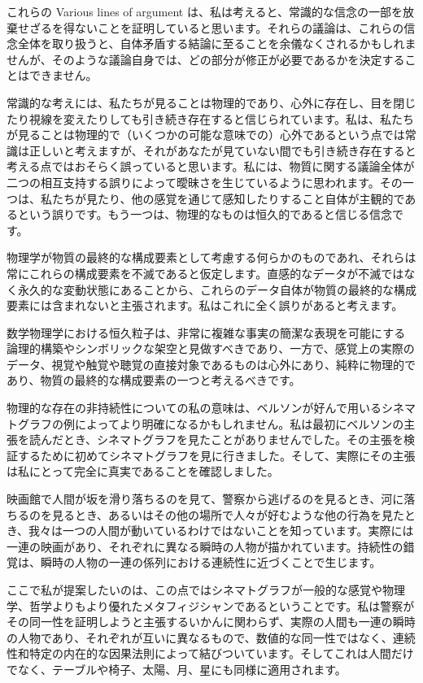 \documentclass[a4paper,11pt,openany]{ltjsbook}
\begin{document}
これらの Various lines of argument は、私は考えると、常識的な信念の一部を放棄せざるを得ないことを証明していると思います。それらの議論は、これらの信念全体を取り扱うと、自体矛盾する結論に至ることを余儀なくされるかもしれませんが、そのような議論自身では、どの部分が修正が必要であるかを決定することはできません。

常識的な考えには、私たちが見ることは物理的であり、心外に存在し、目を閉じたり視線を変えたりしても引き続き存在すると信じられています。私は、私たちが見ることは物理的で（いくつかの可能な意味での）心外であるという点では常識は正しいと考えますが、それがあなたが見ていない間でも引き続き存在すると考える点ではおそらく誤っていると思います。私には、物質に関する議論全体が二つの相互支持する誤りによって曖昧さを生じているように思われます。その一つは、私たちが見たり、他の感覚を通じて感知したりすること自体が主観的であるという誤りです。もう一つは、物理的なものは恒久的であると信じる信念です。

物理学が物質の最終的な構成要素として考慮する何らかのものであれ、それらは常にこれらの構成要素を不滅であると仮定します。直感的なデータが不滅ではなく永久的な変動状態にあることから、これらのデータ自体が物質の最終的な構成要素には含まれないと主張されます。私はこれに全く誤りがあると考えます。

数学物理学における恒久粒子は、非常に複雑な事実の簡潔な表現を可能にする論理的構築やシンボリックな架空と見做すべきであり、一方で、感覚上の実際のデータ、視覚や触覚や聴覚の直接対象であるものは心外にあり、純粋に物理的であり、物質の最終的な構成要素の一つと考えるべきです。

物理的な存在の非持続性についての私の意味は、ベルソンが好んで用いるシネマトグラフの例によってより明確になるかもしれません。私は最初にベルソンの主張を読んだとき、シネマトグラフを見たことがありませんでした。その主張を検証するために初めてシネマトグラフを見に行きました。そして、実際にその主張は私にとって完全に真実であることを確認しました。

映画館で人間が坂を滑り落ちるのを見て、警察から逃げるのを見るとき、河に落ちるのを見るとき、あるいはその他の場所で人々が好むような他の行為を見たとき、我々は一つの人間が動いているわけではないことを知っています。実際には一連の映画があり、それぞれに異なる瞬時の人物が描かれています。持続性の錯覚は、瞬時の人物の一連の係列における連続性に近づくことで生じます。

ここで私が提案したいのは、この点ではシネマトグラフが一般的な感覚や物理学、哲学よりもより優れたメタフィジシャンであるということです。私は警察がその同一性を証明しようと主張するいかんに関わらず、実際の人間も一連の瞬時の人物であり、それぞれが互いに異なるもので、数値的な同一性ではなく、連続性和特定の内在的な因果法則によって結びついています。そしてこれは人間だけでなく、テーブルや椅子、太陽、月、星にも同様に適用されます。
\end{document}
